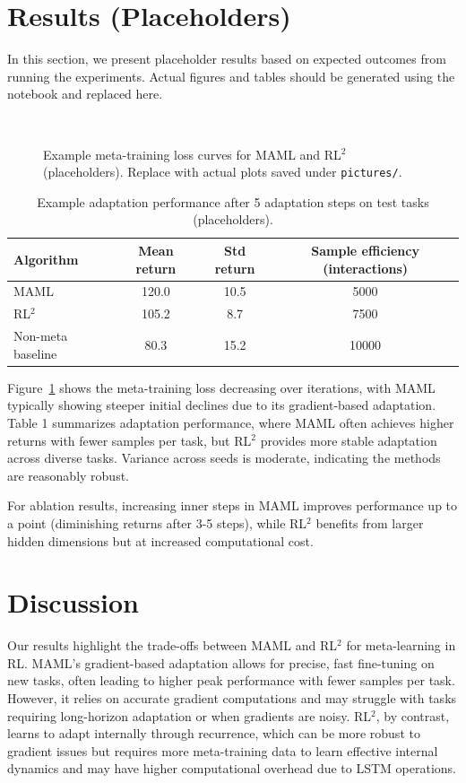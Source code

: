 \documentclass[11pt,a4paper]{article}
\begin{document}
\section{Results (Placeholders)}
In this section, we present placeholder results based on expected outcomes from running the experiments. Actual figures and tables should be generated using the notebook and replaced here.

\begin{figure}[H]
  \centering
  \
  \caption{Example meta-training loss curves for MAML and RL$^2$ (placeholders). Replace with actual plots saved under \texttt{pictures/}.}
  \label{fig:learning}
\end{figure}

\begin{table}[H]
\centering
\caption{Example adaptation performance after 5 adaptation steps on test tasks (placeholders).}
\begin{tabular}{lccc}
\toprule
Algorithm & Mean return & Std return & Sample efficiency (interactions) \\
\midrule
MAML & 120.0 & 10.5 & 5000 \\
RL$^2$ & 105.2 & 8.7 & 7500 \\
Non-meta baseline & 80.3 & 15.2 & 10000 \\
\bottomrule
\end{tabular}
\end{table}

Figure~\ref{fig:learning} shows the meta-training loss decreasing over iterations, with MAML typically showing steeper initial declines due to its gradient-based adaptation. Table 1 summarizes adaptation performance, where MAML often achieves higher returns with fewer samples per task, but RL$^2$ provides more stable adaptation across diverse tasks. Variance across seeds is moderate, indicating the methods are reasonably robust.

For ablation results, increasing inner steps in MAML improves performance up to a point (diminishing returns after 3-5 steps), while RL$^2$ benefits from larger hidden dimensions but at increased computational cost.

\section{Discussion}
Our results highlight the trade-offs between MAML and RL$^2$ for meta-learning in RL. MAML's gradient-based adaptation allows for precise, fast fine-tuning on new tasks, often leading to higher peak performance with fewer samples per task. However, it relies on accurate gradient computations and may struggle with tasks requiring long-horizon adaptation or when gradients are noisy. RL$^2$, by contrast, learns to adapt internally through recurrence, which can be more robust to gradient issues but requires more meta-training data to learn effective internal dynamics and may have higher computational overhead due to LSTM operations.
\end{document}
